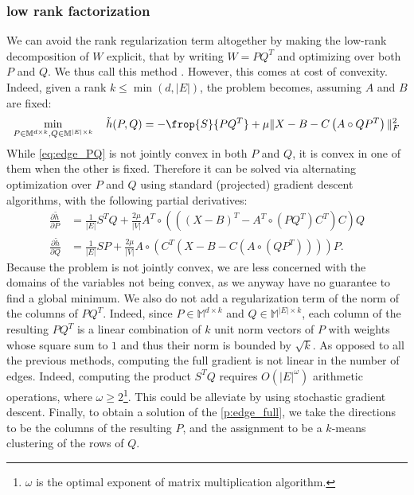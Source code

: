 \subsubsection{\pqt{} low rank factorization}

We can avoid the rank regularization term altogether by making the low-rank decomposition of $W$
explicit, that by writing $W=PQ^T$ and optimizing over both $P$ and $Q$. We thus call this method
\pqt{}. However, this comes at cost
of convexity. Indeed, given a rank $k\leq \min(d,|E|)$, the problem becomes, assuming $A$ and $B$
are fixed:
\begin{equation}
  \label{eq:edge_PQ}
  \min_{P\in\mathbb{M}^{d\times k}, Q\in\mathbb{M}^{|E|\times k}} \quad \tilde{h}(P, Q) =
  - \frop{S}{PQ^T} + \mu \|X - B - C\left(A\circ QP^T \right)\|_F^2
\end{equation}
While \eqref{eq:edge_PQ} is not jointly convex in both $P$ and $Q$, it is convex in one of
them when the other is fixed. Therefore it can be solved via alternating optimization over $P$ and
$Q$ using standard (projected) gradient descent algorithms, with the following partial derivatives:
\begin{align*}
  \frac{\partial \tilde{h}}{\partial P} &=
  \frac{1}{|E|} S^T Q + \frac{2\mu}{|V|}
  A^T \circ (((X-B)^T -A^T \circ (PQ^T )C^T )C)Q 
  \\
  \frac{\partial \tilde{h}}{\partial Q} &=
  \frac{1}{|E|} S P + \frac{2\mu}{|V|}
  A\circ (C^T (X-B-C(A\circ (QP^T ))))P.
\end{align*}
Because the problem is not jointly convex, we are less concerned with the domains of the variables
not being convex, as we anyway have no guarantee to find a global minimum. We also do not add a
regularization term of the norm of the columns of $PQ^T$. Indeed, since $P\in\mathbb{M}^{d\times k}$
and $Q\in\mathbb{M}^{|E|\times k}$, each column of the resulting $PQ^T$ is a linear combination of
$k$ unit norm vectors of $P$ with weights whose square sum to $1$ and thus their norm is bounded by
$\sqrt{k}$. As opposed to all the previous methods, computing the full gradient is not linear in the
number of edges. Indeed, computing the product $S^T Q$ requires $O(|E|^\omega)$ arithmetic
operations, where $\omega \geq 2$\footnote{$\omega$ is the optimal exponent of matrix multiplication
algorithm.}. This could be alleviate by using stochastic gradient descent. Finally, to obtain a
solution of the \ecp{} \autoref{p:edge_full}, we take the directions to be the columns of the
resulting $P$, and the assignment to be a $k$-means clustering of the rows of $Q$.

